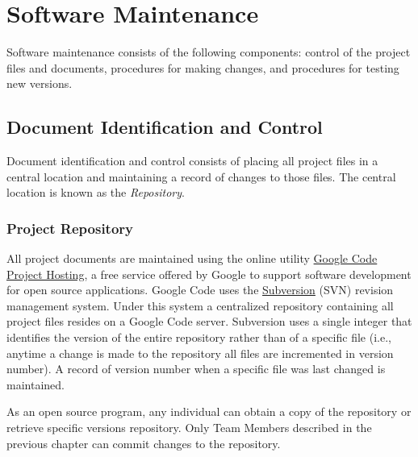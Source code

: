 \documentclass[11pt]{book}
\begin{document}
\chapter{Software Maintenance}

Software maintenance consists of the following components:
control of the project files and documents, procedures for making changes, and procedures for testing new versions.


\section{Document Identification and Control}

Document identification and control consists of placing all project files in a central location and maintaining a record of changes to those files.
The central location is known as the {\em Repository}.


\subsection{Project Repository}

All project documents are maintained using the online utility \href{http://code.google.com/opensource}{{Google Code Project Hosting}}, a free service
offered by Google to support software development for open source applications.  Google Code uses the \href{http://subversion.tigris.org}{{Subversion}} (SVN) revision management system.
Under this system a centralized repository containing all project files resides on a Google Code server.
Subversion uses a single integer that identifies the version of the entire repository rather than of a specific file
(i.e., anytime a change is made to the repository all files are incremented in version number).  A record of version number when a specific file was last changed is maintained.

As an open source program, any individual can obtain a copy of the repository or retrieve specific versions
repository.  Only Team Members described in the previous chapter can commit changes to the repository.
\end{document}
